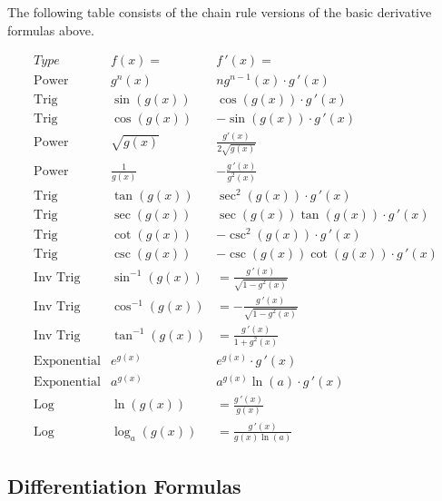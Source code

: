 \documentclass[handout]{ximera}
\begin{document}
The following table consists of the chain rule versions of the basic derivative formulas above.

\begin{center}
\[
\begin{array}{c|c|c}
		Type & f(x)= & f\,'(x)=  \\
		\hline
		\text{Power} & g^n(x) & ng^{n-1}(x)\cdot g\,'(x)  \\[8pt]
		\hline
		\text{Trig} & \sin\left(g(x)\right) & \cos\left(g(x)\right) \cdot g\,'(x) \\[8pt]
		\text{Trig} & \cos\left(g(x)\right) & -\sin\left(g(x)\right)\cdot g\,'(x)  \\[8pt]
		\hline
		\text{Power} & \sqrt{g(x)} & \displaystyle \frac{g'(x)}{2\sqrt {g(x)}}\\[8pt]
		\text{Power} & \displaystyle \frac{1}{g(x)} & -\displaystyle \frac{g\,'(x)}{g^2(x)}\\[8pt]
	  \hline
	  \text{Trig} & \tan\left(g(x)\right) & \sec^2\left(g(x)\right) \cdot g\,'(x) \\[8pt]
		\text{Trig} & \sec\left(g(x)\right) & \sec\left(g(x)\right)\tan\left(g(x)\right) \cdot g\,'(x) \\[8pt]
		\hline
		\text{Trig} & \cot\left(g(x)\right) & -\csc^2\left(g(x)\right) \cdot g\,'(x)  \\[8pt]
		\text{Trig} & \csc\left(g(x)\right) & -\csc\left(g(x)\right)\cot\left(g(x)\right) \cdot g\,'(x)  \\[8pt]
		\hline
		\text{Inv Trig} & \sin^{-1}\left(g(x)\right) &  = \frac{g\,'(x)}{\sqrt{1-g^2(x)}}  \\[8pt]
		\text{Inv Trig} & \cos^{-1}\left(g(x)\right) &  = -\frac{g\,'(x)}{\sqrt{1-g^2(x)}}\\[8pt]
		\text{Inv Trig} & \tan^{-1}\left(g(x)\right) &  = \frac{g\,'(x)}{1+g^2(x)} \\[8pt]
		\hline
		\text{Exponential} & e^{g(x)} & e^{g(x)} \cdot g\,'(x) \\[8pt]
		\text{Exponential} & a^{g(x)} & a^{g(x)}\ln(a) \cdot g\,'(x) \\[8pt]
		\hline
		\text{Log} & \ln\left(g(x)\right) &  = \frac{g\,'(x)}{g(x)} \\[8pt]
		\text{Log} & \log_a\left(g(x)\right) &  = \frac{g\,'(x)}{g(x)\ln(a)}
	\end{array}
    \]
\end{center}


\subsection{Differentiation Formulas}
\end{document}
